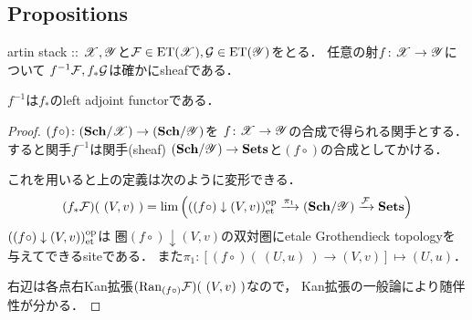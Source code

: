 \documentclass[a4paper, dvipdfmx]{jsarticle}
\newcommand{\xto}[1]{\xrightarrow{#1}}
\begin{document}
\subsection{Propositions}
\begin{Lemma}[\cite{SP} 06NW]
    artin stack :: $\mathscr{X}, \mathscr{Y}$と$\mathcal{F} \in \mathrm{ET}(\mathscr{X}), \mathcal{G} \in \mathrm{ET}(\mathscr{Y})$をとる．
    任意の射$f \colon \mathscr{X} \to \mathscr{Y}$について
    $f^{-1}\mathcal{F}, f_*\mathcal{G}$は確かにsheafである．
\end{Lemma}

\begin{Prop}[\cite{SP} 00XF]
    $f^{-1}$は$f_*$のleft adjoint functorである．
\end{Prop}
\begin{proof}
    $(f \circ) \colon (\mathbf{Sch}/\mathscr{X}) \to (\mathbf{Sch}/\mathscr{Y})$を
    $f \colon \mathscr{X} \to \mathscr{Y}$の合成で得られる関手とする．
    すると関手$f^{-1}$は関手(sheaf) $(\mathbf{Sch}/\mathscr{Y}) \to \mathbf{Sets}$と$(f \circ)$の合成としてかける．

    これを用いると上の定義は次のように変形できる．
    \[
        (f_*\shF)(\ (V,v)\ )
        =\Lim\Big(  ((f \circ) \downarrow (V,v))_{\et}^{\mathrm{op}} \xto{\pi_1} (\Sch/\fibY) \xto{\shF} \Sets \Big)
    \]
    $((f \circ) \downarrow (V,v))_{\mathrm{et}}^{\mathrm{op}}$は
    圏$(f \circ) \downarrow (V,v)$の双対圏にetale Grothendieck topologyを与えてできるsiteである．
    また$\pi_1 \colon [(f \circ)(\ (U,u)\ ) \to (V,v)] \mapsto (U,u)$．
    
    右辺は各点右Kan拡張$(\mathrm{Ran}_{(f \circ)} \mathcal{F})(\ (V,v)\ )$なので，
    Kan拡張の一般論により随伴性が分かる．
\end{proof}
\end{document}
